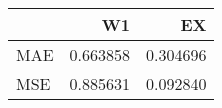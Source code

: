 \begin{tabular}{lrr}
\toprule
{} &        W1 &        EX \\
\midrule
MAE &  0.663858 &  0.304696 \\
MSE &  0.885631 &  0.092840 \\
\bottomrule
\end{tabular}

